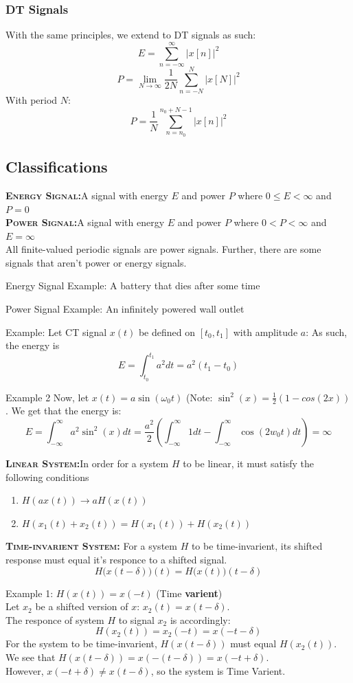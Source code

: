 \documentclass[a4paper,12pt]{article}
\newcommand{\define}[2]{\label{#1}\textbf{\textsc{#1:}}\quad#2\\}
\begin{document}
\subsubsection{DT Signals}
With the same principles, we extend to DT signals as such:
$$ E=\sum\limits_{n=-\infty}^{\infty} |x[n]|^2 $$
$$ P=\lim_{N\to\infty} \frac{1}{2N}\sum\limits_{n=-N}^{N}|x[N]|^2 $$
With period $N$:
$$ P = \frac{1}{N}\sum\limits_{n=n_0}^{n_0+N-1}|x[n]|^2 $$
\subsection{Classifications}
\define{Energy Signal}{A signal with energy $E$ and power $P$ where $0\leq E<\infty$ and $P=0$}
\define{Power Signal}{A signal with energy $E$ and power $P$ where $0<P<\infty$ and $E=\infty$}
All finite-valued periodic signals are power signals. Further, there are some signals that aren't power or energy signals.

Energy Signal Example: A battery that dies after some time

Power Signal Example: An infinitely powered wall outlet

Example:
Let CT signal $x(t)$ be defined on $[t_0,t_1]$ with amplitude $a$:
As such, the energy is 
$$ E = \int_{t_0}^{t_1} a^2 dt = a^2(t_1-t_0) $$

Example 2
Now, let $x(t)=a\sin(\omega_0t)$ (Note: $\sin^2(x)=\frac{1}{2}(1-cos(2x))$. We get that the energy is:
$$ E=\int_{-\infty}^\infty a^2\sin^2(x)dt=\frac{a^2}{2}\left(\int_{-\infty}^\infty1dt-\int_{-\infty}^\infty\cos(2w_0t)dt\right)=\infty $$


\define{Linear System}{In order for a system $H$ to be linear, it must satisfy the following conditions}
\begin{enumerate}
	\item $H(ax(t))\rightarrow aH(x(t))$
	\item $H(x_1(t)+x_2(t))=H(x_1(t))+H(x_2(t))$
\end{enumerate}%

\define{Time-invarient System}{
	For a system $H$ to be time-invarient, its shifted response must equal it's responce to a shifted signal. 
	$$H\Big(x(t-\delta)\Big)(t)=H\Big(x(t)\Big)(t-\delta)$$

	Example 1: $H(x(t))=x(-t)$ (Time \textbf{varient})\\
	Let $x_2$ be a shifted version of $x$: $x_2(t)=x(t-\delta)$.\\
	The responce of system $H$ to signal $x_2$ is accordingly:\\
	$$H(x_2(t)) = x_2(-t) = x(-t-\delta)$$
	For the system to be time-invarient, $H(x(t-\delta))$ must equal $H(x_2(t))$.\\
	We see that $H(x(t-\delta)) = x(-(t-\delta)) = x(-t+\delta)$.\\
	However, $x(-t+\delta)\neq x(t-\delta)$, so the system is Time Varient.
}
\end{document}
